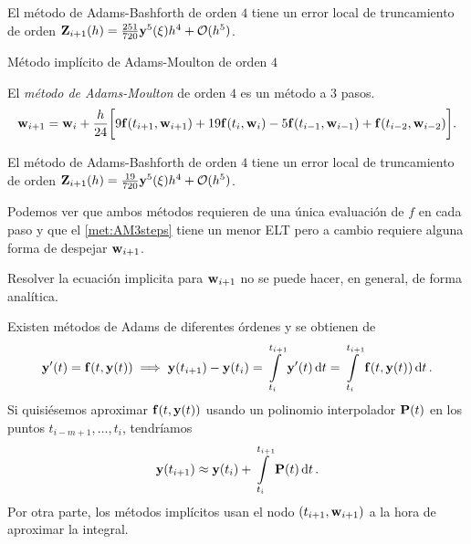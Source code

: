 \begin{proposition}
    El método de Adams-Bashforth de orden $4$
    tiene un error local de truncamiento
    de orden $\vb{Z}{}_{i+1}(h) = \frac{251}{720}\vb{y}{}^5(\xi)h^4 + \vb{\mathcal{O}}{}(h^5)$.
\end{proposition}

\begin{method}{Método implícito de Adams-Moulton de orden $4$}
    \label{met:AM3steps}

    El \emph{método de Adams-Moulton} de orden $4$
    es un método a $3$ pasos.
    \begin{equation}
        \vb{w}{}_{i+1} = \vb{w}{}_i + \frac{h}{24}\qty\bigg[
            9\vb{f}{}(t_{i+1}, \vb{w}{}_{i+1}) + 19\vb{f}{}(t_i, \vb{w}{}_i)
            - 5\vb{f}{}(t_{i-1}, \vb{w}{}_{i-1}) + \vb{f}{}(t_{i-2}, \vb{w}{}_{i-2})
        ].
    \end{equation}
\end{method}

\begin{proposition}
    El método de Adams-Bashforth de orden $4$
    tiene un error local de truncamiento
    de orden $\vb{Z}{}_{i+1}(h) = \frac{19}{720}\vb{y}{}^5(\xi)h^4 + \vb{\mathcal{O}}{}(h^5)$.
\end{proposition}

Podemos ver que ambos métodos requieren de una única evaluación de $f$
en cada paso y que el \cref{met:AM3steps} tiene un menor ELT pero a cambio
requiere alguna forma de despejar $\vb{w}{}_{i+1}$.

\begin{remark}
    Resolver la ecuación implicita para $\vb{w}{}_{i+1}$ no se puede hacer,
    en general, de forma analítica.
\end{remark}

\begin{remark}
    Existen métodos de Adams de diferentes órdenes y se obtienen de
    \begin{equation*}
        \vb{y}{}'(t) = \vb{f}{}(t,\vb{y}{}(t)) \implies
        \vb{y}{}(t_{i+1}) - \vb{y}{}(t_i) =
        \int\limits_{t_i}^{t_{i+1}} \vb{y}{}'(t) \dd{t} =
        \int\limits_{t_i}^{t_{i+1}} \vb{f}{}(t,\vb{y}{}(t)) \dd{t}.
    \end{equation*}
    Si quisiésemos aproximar $\vb{f}{}(t,\vb{y}{}(t))$ usando un polinomio interpolador
    $\vb{P}(t)$ en los puntos $t_{i-m+1},\dots,t_i$,
    tendríamos
    \begin{equation*}
        \vb{y}{}(t_{i+1}) \approx
        \vb{y}{}(t_i) + \int\limits_{t_i}^{t_{i+1}} \vb{P}(t) \dd{t}.
    \end{equation*}
    Por otra parte, los métodos implícitos usan el nodo $(t_{i+1}, \vb{w}{}_{i+1})$
    a la hora de aproximar la integral.
\end{remark}

